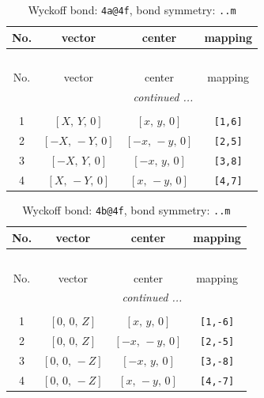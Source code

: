 \documentclass[fleqn,8pt]{jsarticle}
\begin{document}
\begin{longtable}{cccc}
\caption{Wyckoff bond: {\tt 4a@4f}, bond symmetry: {\tt ..m}}
 \\
 \hline \hline
No. & vector & center & mapping \\ \hline \endfirsthead

\multicolumn{3}{l}{\tablename\ \thetable{}} \\
 \hline \hline
No. & vector & center & mapping \\ \hline \endhead

 \hline \hline
\multicolumn{3}{r}{\footnotesize\it continued ...} \\ \endfoot

 \hline \hline
\multicolumn{3}{r}{} \\ \endlastfoot

1 & $\left[ X,\, Y,\, 0 \right]$ & $\left[ x,\, y,\, 0 \right]$ & {\tt [1,6]} \\ \hline
2 & $\left[ - X,\, - Y,\, 0 \right]$ & $\left[ - x,\, - y,\, 0 \right]$ & {\tt [2,5]} \\ \hline
3 & $\left[ - X,\, Y,\, 0 \right]$ & $\left[ - x,\, y,\, 0 \right]$ & {\tt [3,8]} \\ \hline
4 & $\left[ X,\, - Y,\, 0 \right]$ & $\left[ x,\, - y,\, 0 \right]$ & {\tt [4,7]} \\
\end{longtable}
\renewcommand{\arraystretch}{1.2}
\begin{longtable}{cccc}
\caption{Wyckoff bond: {\tt 4b@4f}, bond symmetry: {\tt ..m}}
 \\
 \hline \hline
No. & vector & center & mapping \\ \hline \endfirsthead

\multicolumn{3}{l}{\tablename\ \thetable{}} \\
 \hline \hline
No. & vector & center & mapping \\ \hline \endhead

 \hline \hline
\multicolumn{3}{r}{\footnotesize\it continued ...} \\ \endfoot

 \hline \hline
\multicolumn{3}{r}{} \\ \endlastfoot

1 & $\left[ 0,\, 0,\, Z \right]$ & $\left[ x,\, y,\, 0 \right]$ & {\tt [1,-6]} \\ \hline
2 & $\left[ 0,\, 0,\, Z \right]$ & $\left[ - x,\, - y,\, 0 \right]$ & {\tt [2,-5]} \\ \hline
3 & $\left[ 0,\, 0,\, - Z \right]$ & $\left[ - x,\, y,\, 0 \right]$ & {\tt [3,-8]} \\ \hline
4 & $\left[ 0,\, 0,\, - Z \right]$ & $\left[ x,\, - y,\, 0 \right]$ & {\tt [4,-7]} \\
\end{longtable}
\end{document}
